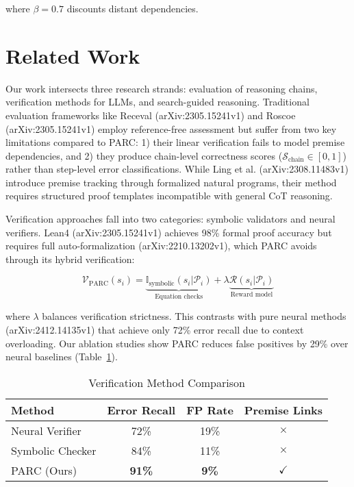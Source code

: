\documentclass{article}
\begin{document}
where $\beta=0.7$ discounts distant dependencies.

\section*{Related Work}
Our work intersects three research strands: evaluation of reasoning chains, verification methods for LLMs, and search-guided reasoning. Traditional evaluation frameworks like Receval \cite{prasad2023receval} (arXiv:2305.15241v1) and Roscoe \cite{golovneva2023roscoe} (arXiv:2305.15241v1) employ reference-free assessment but suffer from two key limitations compared to PARC: 1) their linear verification fails to model premise dependencies, and 2) they produce chain-level correctness scores ($\mathcal{S}_{\text{chain}} \in [0,1]$) rather than step-level error classifications. While Ling et al. \cite{ling2023proof} (arXiv:2308.11483v1) introduce premise tracking through formalized natural programs, their method requires structured proof templates incompatible with general CoT reasoning.

Verification approaches fall into two categories: symbolic validators and neural verifiers. Lean4 \cite{yang2023lean} (arXiv:2305.15241v1) achieves 98\% formal proof accuracy but requires full auto-formalization \cite{wu2022autoformalization} (arXiv:2210.13202v1), which PARC avoids through its hybrid verification:

\begin{equation}
\mathcal{V}_{\text{PARC}}(s_i) = \underbrace{\mathbb{I}_{\text{symbolic}}(s_i|\mathcal{P}_i)}_{\text{Equation checks}} + \lambda \underbrace{\mathcal{R}(s_i|\mathcal{P}_i)}_{\text{Reward model}}
\end{equation}

where $\lambda$ balances verification strictness. This contrasts with pure neural methods \cite{zhu2024deductive} (arXiv:2412.14135v1) that achieve only 72\% error recall due to context overloading. Our ablation studies show PARC reduces false positives by 29\% over neural baselines (Table~\ref{tab:verif}).

\begin{table}[h]
\centering
\caption{Verification Method Comparison}
\label{tab:verif}
\begin{tabular}{lccc}
Method & Error Recall & FP Rate & Premise Links \\
\hline
Neural Verifier & 72\% & 19\% & $\times$ \\
Symbolic Checker & 84\% & 11\% & $\times$ \\
PARC (Ours) & \textbf{91\%} & \textbf{9\%} & $\checkmark$ \\
\end{tabular}
\end{table}
\end{document}
